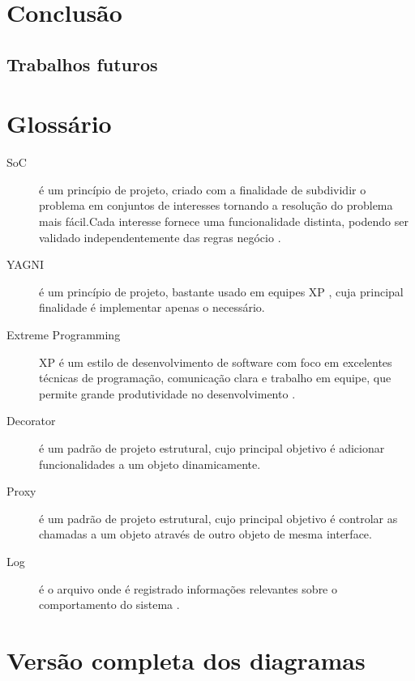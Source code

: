 \documentclass[tc,oneside]{iiufrgs}
\begin{document}
\chapter{Conclusão}

\section{Trabalhos futuros}


\singlespacing



\chapter*{Glossário}

\begin{description}
	\item[SoC] é um princípio de projeto, criado com a finalidade de subdividir o problema em conjuntos de interesses tornando a resolução do problema mais fácil.Cada interesse fornece uma funcionalidade distinta, podendo ser validado independentemente das regras negócio \cite{pressman2010engineering}.
	\item [YAGNI] é um princípio de projeto, bastante usado em equipes XP , cuja principal finalidade é implementar apenas o necessário.
	\item[Extreme Programming] XP é um estilo de desenvolvimento de software com foco em excelentes técnicas de programação, comunicação clara e trabalho em equipe, que permite grande produtividade no desenvolvimento \cite{beck2004extreme}.
\item [Decorator] é um padrão de projeto estrutural, cujo principal objetivo é adicionar funcionalidades a um objeto dinamicamente.
\item [Proxy] é um padrão de projeto estrutural, cujo principal objetivo é controlar as chamadas a um objeto através de outro objeto de mesma interface.
\item [Log] é o arquivo onde é registrado informações relevantes sobre o comportamento do sistema \cite{log}.
\end{description}

\appendix

\chapter{Versão completa dos diagramas}
\label{apend:A}
\end{document}
